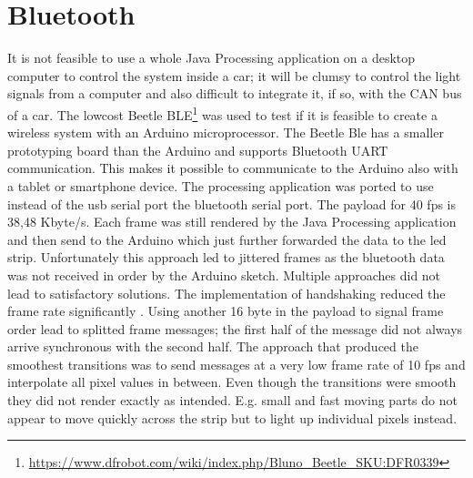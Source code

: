 \section{Bluetooth}
It is not feasible to use a whole Java Processing application on a desktop computer to control the system inside a car; it will be clumsy to control the light signals from a computer and also difficult to integrate it, if so, with the CAN bus of a car. The lowcost Beetle BLE\footnote{\url{https://www.dfrobot.com/wiki/index.php/Bluno_Beetle_SKU:DFR0339}} was used to test if it is feasible to create a wireless system with an Arduino microprocessor. The Beetle Ble has a smaller prototyping board than the Arduino and supports Bluetooth UART communication. This makes it possible to communicate to the Arduino also with a tablet or smartphone device. The processing application was ported to use instead of the usb serial port the bluetooth serial port. The payload for 40 fps is 38,48 Kbyte/s.
Each frame was still rendered by the Java Processing application and then send to the Arduino which just further forwarded the data to the led strip. Unfortunately this approach led to jittered frames as the bluetooth data was not received in order by the Arduino sketch. Multiple approaches did not lead to satisfactory solutions. The implementation of handshaking reduced the frame rate significantly . Using another 16 byte in the payload to signal frame order lead to splitted frame messages; the first half of the message did not always arrive synchronous with the second half. The approach that produced the smoothest transitions was to send messages at a very low frame rate of 10 fps and interpolate all pixel values in between. Even though the transitions were smooth they did not render exactly as intended. E.g. small and fast moving parts do not appear to move quickly across the strip but to light up individual pixels instead. 
